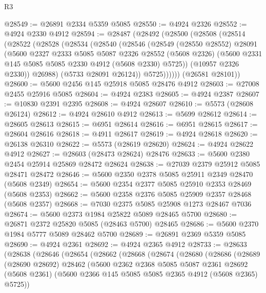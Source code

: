 \begin{lexlean}{R3}
\begin{coremodule}
@28549 := @26891 @2334 @5359 @5085
@28550 := @4924 @2326
@28552 := @4924 @2330 @4912
@28594 := @28487
    (@28492
      (@28500
        (@28508
          (@28514
            (@28522
              (@28528
                (@28534
                  (@28540
                    (@28546
                      (@28549
                        (@28550 @28552)
                        @28091
                        (@5600
                          @2327
                          @2333
                          @5085
                          @5087
                          @2326
                          @28552
                          (@5608 @2326)
                          (@5600 @2331 @145 @5085 @5085 @2330 @4912 (@5608 @2330) @5725))
                        (@10957 @2326 @2330))
                      @26988)
                    (@5733 @28091 @26124))
                  @5725))))))
      (@26581 @28101))
@28600 := @5600 @2456 @145 @25918 @5085 @28476 @4912
@28603 := @27008 @2455 @25916 @5085
@28604 := @4924 @2383
@28605 := @4924 @2387
@28607 := @10830 @2391 @2395
@28608 := @4924 @28607
@28610 := @5573 (@28608 @26124)
@28612 := @4924 @28610 @4912
@28613 := @5699 @28612
@28614 := @28605 @28613
@28615 := @6951 @28614
@28616 := @6951 @28615
@28617 := @28604 @28616
@28618 := @4911 @28617
@28619 := @4924 @28618
@28620 := @26138 @26310
@28622 := @5573 (@28619 @28620)
@28624 := @4924 @28622 @4912
@28627 := @28603 (@28473 @28624) @28476
@28633 := @5600 @2380 @2454 @25914 @25869 @28472 @28624
@28638 := @27039 @2379 @25912 @5085 @28471 @28472
@28646 := @5600 @2350 @2378 @5085 @25911 @2349 @28470 (@5608 @2349)
@28654 := @5600 @2354 @2377 @5085 @25910 @2353 @28469 (@5608 @2353)
@28662 := @5600 @2358 @2376 @5085 @25909 @2357 @28468 (@5608 @2357)
@28668 := @7030 @2375 @5085 @25908 @1273 @28467 @7036
@28674 := @5600 @2373 @1984 @25822 @5089 @28465 @5700
@28680 := @26871 @2372 @25820 @5085 (@28463 @5700) @28465
@28686 := @5600 @2370 @1984 @5777 @5089 @28462 @5700
@28689 := @26891 @2369 @5359 @5085
@28690 := @4924 @2361
@28692 := @4924 @2365 @4912
@28733 := @28633
    (@28638
      (@28646
        (@28654
          (@28662
            (@28668
              (@28674
                (@28680
                  (@28686
                    (@28689
                      (@28690 @28692)
                      @28462
                      (@5600
                        @2362
                        @2368
                        @5085
                        @5087
                        @2361
                        @28692
                        (@5608 @2361)
                        (@5600 @2366 @145 @5085 @5085 @2365 @4912 (@5608 @2365) @5725))

\end{coremodule}
\end{lexlean}
